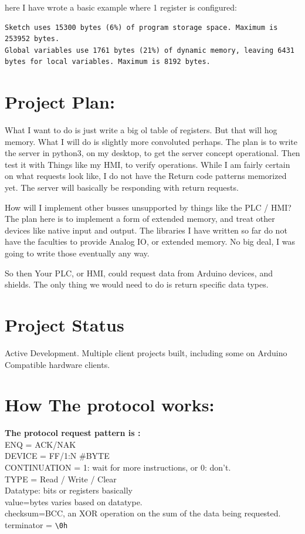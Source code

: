 \documentclass[12pt]{article}
\begin{document}
here I have wrote a basic example where 1 register is configured:

\begin{verbatim}
Sketch uses 15300 bytes (6%) of program storage space. Maximum is 253952 bytes.
Global variables use 1761 bytes (21%) of dynamic memory, leaving 6431 bytes for local variables. Maximum is 8192 bytes.
\end{verbatim}

\section*{Project Plan:}
What I want to do is just write a big ol table of registers. But that will hog memory. What I will do is slightly more convoluted perhaps. 
The plan is to write the server in python3, on my desktop, to get the server concept operational. Then test it with Things like my HMI, to verify operations.
While I am fairly certain on what requests look like, I do not have the Return code patterns memorized yet. The server will basically be responding with return requests. 

How will I implement other busses unsupported by things like the PLC / HMI? The plan here is to implement a form of extended memory, and treat other devices like native input and output.  The libraries I have written so far do not have the faculties to provide Analog IO, or extended memory. No big deal, I was going to write those eventually any way. 

So then Your PLC, or HMI, could request data from Arduino devices, and shields. The only thing we would need to do is return specific data types. 

\section*{Project Status}
Active Development. Multiple client projects built, including some on Arduino Compatible hardware clients. 


\section*{How The protocol works:}
\textbf{The protocol request pattern is :}  \\
ENQ = ACK/NAK    \\
DEVICE = FF/1:N  \#BYTE \\
CONTINUATION =   1: wait for more instructions, or 0: don't.\\
TYPE = Read / Write / Clear\\
Datatype: bits or registers basically\\
value=bytes varies based on datatype.\\
checksum=BCC, an XOR operation on the sum of the data being requested. \\
terminator = \verb|\0h| \\
\end{document}
